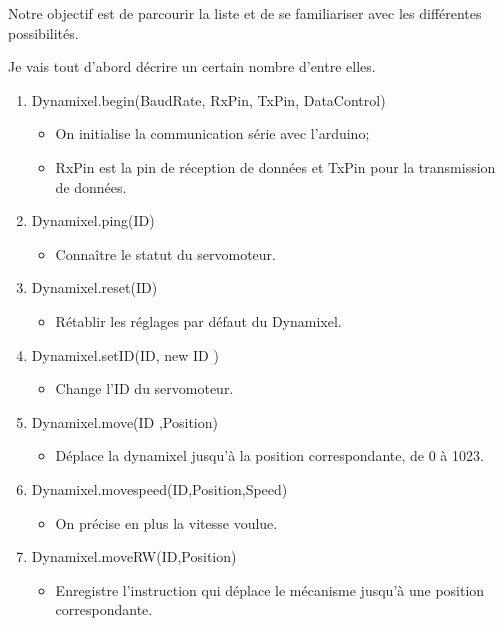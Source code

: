 \noindent Notre objectif est de parcourir la liste et de se familiariser avec les différentes possibilités. 

\noindent Je vais tout d’abord décrire un certain nombre d’entre elles. 

\begin{enumerate}
     \item Dynamixel.begin(BaudRate, RxPin, TxPin, DataControl) \begin{itemize}
         \item On initialise la communication série avec l’arduino;
         \item RxPin est la pin de réception de données et TxPin pour la transmission de données.
     \end{itemize}
     
     \item Dynamixel.ping(ID)
     \begin{itemize}
        \item Connaître le statut du servomoteur.
     \end{itemize}
      
     \item Dynamixel.reset(ID)
     \begin{itemize}
        \item Rétablir les réglages par défaut du Dynamixel.
     \end{itemize}
      
     \item Dynamixel.setID(ID, new ID )
     \begin{itemize}
        \item Change l’ID du servomoteur.
     \end{itemize}
     
     \item Dynamixel.move(ID ,Position)
     \begin{itemize}
        \item Déplace la dynamixel jusqu’à la position correspondante, de 0 à 1023.
     \end{itemize}
     
     \item Dynamixel.movespeed(ID,Position,Speed)
     \begin{itemize}
        \item On précise en plus la vitesse voulue.
     \end{itemize}
     
     \item Dynamixel.moveRW(ID,Position)
     \begin{itemize}
        \item Enregistre l’instruction qui déplace le mécanisme jusqu’à une position correspondante.
     \end{itemize}
     

\end{enumerate}
